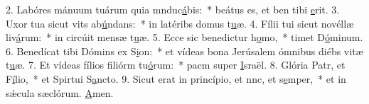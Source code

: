 2. Labóres mánuum tuárum quia mnduc\uline{á}bis:~* beátus es, et ben tibi \uline{e}rit.
3. Uxor tua sicut vits ab\uline{ú}ndans:~* in latéribs domus t\uline{u}æ.
4. Fílii tui sicut novéllæ liv\uline{á}rum:~* in circúit mensæ t\uline{u}æ.
5. Ecce sic benedictur h\uline{o}mo,~*  timet D\uline{ó}minum.
6. Benedícat tibi Dómins ex S\uline{i}on:~* et vídeas bona Jerúsalem ómnibus diébs vitæ t\uline{u}æ.
7. Et vídeas fílios filiórm tu\uline{ó}rum:~* pacm super \uline{I}sraël.
8. Glória Patr, et F\uline{í}lio,~* et Spirtui S\uline{a}ncto.
9. Sicut erat in princípio, et nnc, et s\uline{e}mper,~* et in sǽcula sæclórum. \uline{A}men.
